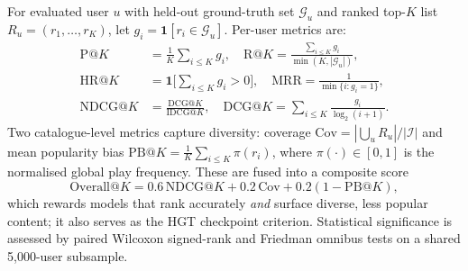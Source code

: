 For evaluated user $u$ with held-out ground-truth set $\mathcal{G}_u$ and ranked top-$K$ list $R_u=(r_1,\dots,r_K)$, let $g_i=\mathbf{1}[r_i\in\mathcal{G}_u]$. Per-user metrics are:
\begin{align*}
\mathrm{P@}K &= \tfrac{1}{K}\textstyle\sum_{i\le K}g_i,\quad
\mathrm{R@}K = \tfrac{\sum_{i\le K}g_i}{\min(K,|\mathcal{G}_u|)},\\
\mathrm{HR@}K &= \mathbf{1}\bigl[\textstyle\sum_{i\le K}g_i>0\bigr],\quad
\mathrm{MRR} = \tfrac{1}{\min\{i:g_i=1\}},\\
\mathrm{NDCG@}K &= \frac{\mathrm{DCG@}K}{\mathrm{IDCG@}K},\quad
\mathrm{DCG@}K = \textstyle\sum_{i\le K}\tfrac{g_i}{\log_2(i+1)}.
\end{align*}
Two catalogue-level metrics capture diversity: coverage $\mathrm{Cov}=|\bigcup_u R_u|/|\mathcal{I}|$ and mean popularity bias $\mathrm{PB@}K=\tfrac{1}{K}\sum_{i\le K}\pi(r_i)$, where $\pi(\cdot)\in[0,1]$ is the normalised global play frequency. These are fused into a composite score
\begin{equation}\label{eq:overall}
\mathrm{Overall@}K = 0.6\,\mathrm{NDCG@}K + 0.2\,\mathrm{Cov} + 0.2(1-\mathrm{PB@}K),
\end{equation}
which rewards models that rank accurately \emph{and} surface diverse, less popular content; it also serves as the HGT checkpoint criterion. Statistical significance is assessed by paired Wilcoxon signed-rank and Friedman omnibus tests on a shared 5,000-user subsample.
